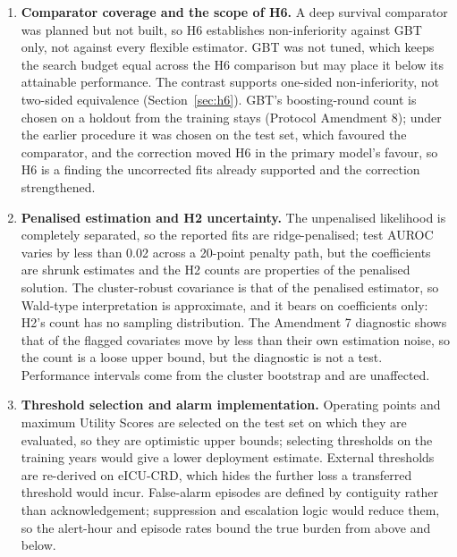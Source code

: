 \begin{enumerate}
    \item \textbf{Comparator coverage and the scope of
    H6.}\label{lim:comparators} A deep survival comparator was planned but not
    built, so H6 establishes non-inferiority against GBT only, not against
    every flexible estimator. GBT was not tuned, which keeps the search budget
    equal across the H6 comparison but may place it below its attainable
    performance. The contrast supports one-sided non-inferiority, not two-sided
    equivalence (Section~\ref{sec:h6}). GBT's boosting-round count is chosen on
    a holdout from the training stays (Protocol Amendment 8); under the earlier
    procedure it was chosen on the test set, which favoured the comparator, and
    the correction moved H6 in the primary model's favour, so H6 is a finding
    the uncorrected fits already supported and the correction strengthened.

    \item \textbf{Penalised estimation and H2 uncertainty.} The unpenalised
    likelihood is completely separated, so the reported fits are
    ridge-penalised; test AUROC varies by less than 0.02 across a 20-point
    penalty path, but the coefficients are shrunk estimates and the H2
    counts are properties of the penalised solution. The cluster-robust
    covariance is that of the penalised estimator, so Wald-type
    interpretation is approximate, and it bears on coefficients only: H2's
    count has no sampling distribution. The Amendment 7 diagnostic shows that
    \pcHTwoNNoise{} of the \pcHTwoNFlagged{} flagged covariates move by less
    than their own estimation noise, so the count is a loose upper bound, but
    the diagnostic is not a test. Performance intervals come from the cluster
    bootstrap and are unaffected.

    \item \textbf{Threshold selection and alarm implementation.} Operating
    points and maximum Utility Scores are selected on the test set on which
    they are evaluated, so they are optimistic upper bounds; selecting
    thresholds on the training years would give a lower deployment estimate.
    External thresholds are re-derived on eICU-CRD, which hides the further
    loss a transferred threshold would incur. False-alarm episodes are defined
    by contiguity rather than acknowledgement; suppression and escalation logic
    would reduce them, so the alert-hour and episode rates bound the true
    burden from above and below.


\end{enumerate}
